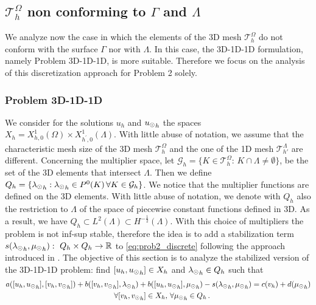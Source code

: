 \def\patch{\omega _j}
\subsection{$\mathcal{T}^{\Omega}_h$ non conforming to $\Gamma$ and $\Lambda$} \label{sec:unfit2}
We analyze now the case in which the elements of the 3D mesh $\mathcal{T}^{\Omega}_h$ do not conform with the surface $\Gamma$ nor with $\Lambda$. In this case, the 3D-1D-1D
formulation, namely Problem 3D-1D-1D, is more suitable. 
Therefore we focus on the analysis of this discretization approach for Problem 2 solely.

\subsubsection{Problem 3D-1D-1D} We consider for the solutions $u_h$ and ${u_{\odot}}_h$ the spaces $X_h = X_{h,0}^1(\Omega) \times X_{h^\prime,0}^1(\Lambda)$. With little abuse of notation, we assume that the characteristic mesh size of the 3D mesh $\mathcal{T}^{\Omega}_h$ and the one of the 1D mesh $\mathcal{T}^{\Lambda}_{h'}$ are different. Concerning the multiplier space, let $\mathcal{G}_h = \{K \in \mathcal{T}^{\Omega}_h: \, K\cap \Lambda \neq \emptyset\}$, be the set of the 3D elements that intersect $\Lambda$. Then we define $Q_h=\{{\lambda_{\odot}}_h : {\lambda_{\odot}}_h \in P^0(K) \, \forall K \in \mathcal{G}_h\}$. We notice that the multiplier functions are defined on the 3D elements. With little abuse of notation, we denote with $Q_h$ also the restriction to $\Lambda$ of the space of piecewise constant functions defined in 3D. As a result, we have $Q_h \subset L^2(\Lambda) \subset H^{-\frac12}(\Lambda)$.
With this choice of multipliers the problem is not inf-sup stable, therefore the idea is to add a stabilization term $s({\lambda_{\odot}}_h, {\mu_{\odot}}_h): \ Q_h \times Q_h \rightarrow \mathbb{R}$ to \eqref{eq:prob2_discrete} following the approach introduced in \cite{burman2014}. 
The objective of this section is to analyze the stabilized version of the 3D-1D-1D problem: find $[u_h, {u_{\odot}}_h] \in X_h$ and ${\lambda_{\odot}}_h \in Q_h$ such that
\begin{multline}\label{eq:prob2_stabilized}
a([u_h, {\ud}_h], [v_h, {\vd}_h]) +
b([v_h, {\vd}_h], {\ld}_h)
+ b([u_h, {\ud}_h], {\md}_h)
- s({\ld}_h, {\md}_h) 
= c(v_h) + d({\md}_h)\\
  \quad \forall [v_h, {\vd}_h] \in X_h, \,
  \forall {\md}_h \in Q_h\,.
\end{multline}
